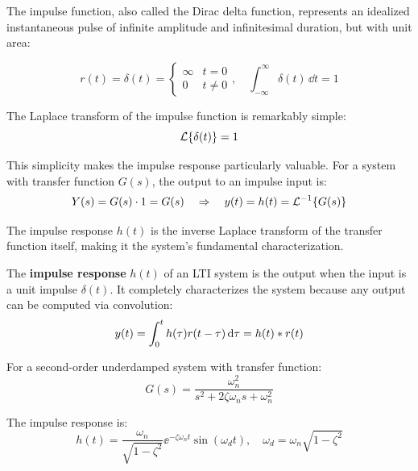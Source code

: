 The impulse function, also called the Dirac delta function, represents an idealized instantaneous pulse of infinite amplitude and infinitesimal duration, but with unit area:

\begin{equation}
r(t) = \delta(t) = \begin{cases} \infty & t = 0 \\ 0 & t \neq 0 \end{cases}, \quad \int_{-\infty}^{\infty} \delta(t)\,\dd t = 1
\end{equation}

The Laplace transform of the impulse function is remarkably simple:
\begin{equation}
\mathcal{L}\{\delta(t)\} = 1
\end{equation}

This simplicity makes the impulse response particularly valuable. For a system with transfer function $G(s)$, the output to an impulse input is:
\begin{equation}
Y(s) = G(s) \cdot 1 = G(s) \quad \Rightarrow \quad y(t) = h(t) = \mathcal{L}^{-1}\{G(s)\}
\end{equation}

The impulse response $h(t)$ is the inverse Laplace transform of the transfer function itself, making it the system's fundamental characterization.

\begin{definitionbox}[title=Impulse Response]
The \textbf{impulse response} $h(t)$ of an LTI system is the output when the input is a unit impulse $\delta(t)$. It completely characterizes the system because any output can be computed via convolution:
\begin{equation}
y(t) = \int_{0}^{t} h(\tau) r(t-\tau)\,\mathrm{d}\tau = h(t) \ast r(t)
\end{equation}
\end{definitionbox}

For a second-order underdamped system with transfer function:
\begin{equation}
G(s) = \frac{\omega_n^2}{s^2 + 2\zeta\omega_n s + \omega_n^2}
\end{equation}

The impulse response is:
\begin{equation}
h(t) = \frac{\omega_n}{\sqrt{1-\zeta^2}}\ee^{-\zeta\omega_n t}\sin(\omega_d t), \quad \omega_d = \omega_n\sqrt{1-\zeta^2}
\end{equation}

